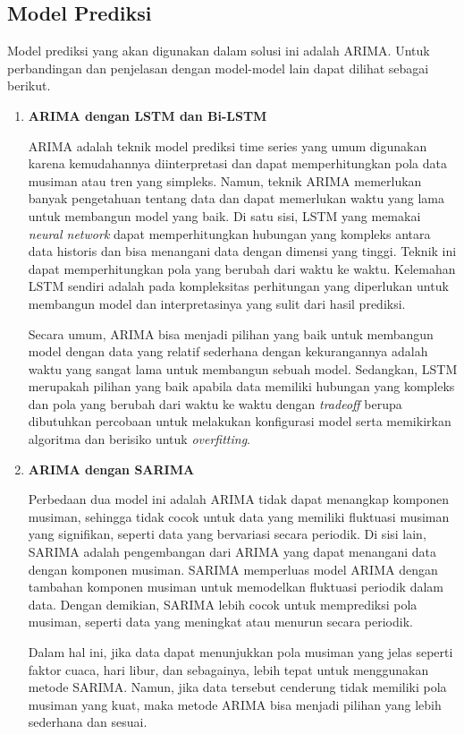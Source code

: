 \subsection{Model Prediksi}

Model prediksi yang akan digunakan dalam solusi ini adalah ARIMA. Untuk perbandingan dan penjelasan dengan model-model lain dapat dilihat sebagai berikut.

\begin{enumerate}
    \item \textbf{ARIMA dengan LSTM dan Bi-LSTM}

    ARIMA adalah teknik model prediksi time series yang umum digunakan karena kemudahannya diinterpretasi dan dapat memperhitungkan pola data musiman atau tren yang simpleks. Namun, teknik ARIMA memerlukan banyak pengetahuan tentang data dan dapat memerlukan waktu yang lama untuk membangun model yang baik. Di satu sisi, LSTM yang memakai \textit{neural network} dapat memperhitungkan hubungan yang kompleks antara data historis dan bisa menangani data dengan dimensi yang tinggi. Teknik ini dapat memperhitungkan pola yang berubah dari waktu ke waktu. Kelemahan LSTM sendiri adalah pada kompleksitas perhitungan yang diperlukan untuk membangun model dan interpretasinya yang sulit dari hasil prediksi.

    Secara umum, ARIMA bisa menjadi pilihan yang baik untuk membangun model dengan data yang relatif sederhana dengan kekurangannya adalah waktu yang sangat lama untuk membangun sebuah model. Sedangkan, LSTM merupakah pilihan yang baik apabila data memiliki hubungan yang kompleks dan pola yang berubah dari waktu ke waktu dengan \textit{tradeoff} berupa dibutuhkan percobaan untuk melakukan konfigurasi model serta memikirkan algoritma dan berisiko untuk \textit{overfitting}.

    \item \textbf{ARIMA dengan SARIMA}
    
    Perbedaan dua model ini adalah ARIMA tidak dapat menangkap komponen musiman, sehingga tidak cocok untuk data yang memiliki fluktuasi musiman yang signifikan, seperti data yang bervariasi secara periodik. Di sisi lain, SARIMA adalah pengembangan dari ARIMA yang dapat menangani data dengan komponen musiman. SARIMA memperluas model ARIMA dengan tambahan komponen musiman untuk memodelkan fluktuasi periodik dalam data. Dengan demikian, SARIMA lebih cocok untuk memprediksi pola musiman, seperti data yang meningkat atau menurun secara periodik.

    Dalam hal ini, jika data dapat menunjukkan pola musiman yang jelas seperti faktor cuaca, hari libur, dan sebagainya, lebih tepat untuk menggunakan metode SARIMA. Namun, jika data tersebut cenderung tidak memiliki pola musiman yang kuat, maka metode ARIMA bisa menjadi pilihan yang lebih sederhana dan sesuai.


\end{enumerate}
